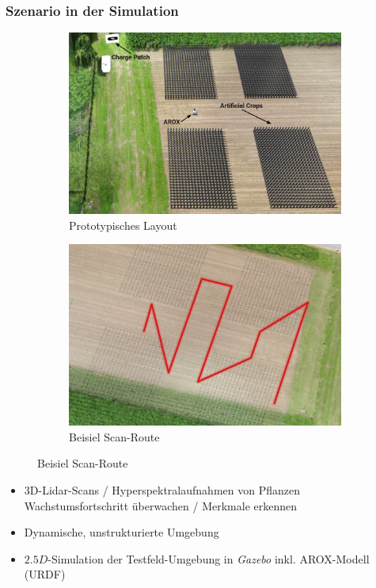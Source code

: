 \documentclass{beamer}
\begin{document}
\begin{frame}
  \frametitle{Szenario in der Simulation}
  \begin{figure}[H]
    \centering
    \begin{subfigure}[b]{0.49\textwidth}
      \centering
      \includegraphics[width=\textwidth]{img/prototype_scenario.jpg}
      \caption*{Prototypisches Layout}
    \end{subfigure}
    \begin{subfigure}[b]{0.49\textwidth}
      \centering
      \includegraphics[width=\textwidth]{img/example_path.png}
      \caption*{Beisiel Scan-Route}
    \end{subfigure}
  \end{figure}
  \begin{itemize}
    \item 3D-Lidar-Scans / Hyperspektralaufnahmen von Pflanzen \textrightarrow \thinspace Wachstumsfortschritt überwachen / Merkmale erkennen
    \item Dynamische, unstrukturierte Umgebung
    \item $2.5D$-Simulation der Testfeld-Umgebung in \textit{Gazebo} inkl. AROX-Modell (URDF)
  \end{itemize}
\end{frame}
\end{document}
